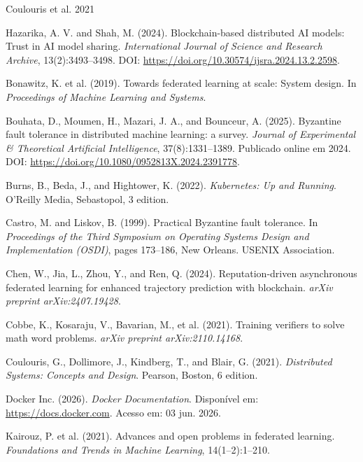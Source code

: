 \documentclass[12pt]{article}
\begin{document}
\begin{thebibliography}{Coulouris et al. 2021}

Hazarika, A. V. and Shah, M. (2024). Blockchain-based distributed AI models: Trust in AI model sharing. \textit{International Journal of Science and Research Archive}, 13(2):3493--3498. DOI: \url{https://doi.org/10.30574/ijsra.2024.13.2.2598}.

Bonawitz, K. et al. (2019). Towards federated learning at scale: System design. In \textit{Proceedings of Machine Learning and Systems}.

Bouhata, D., Moumen, H., Mazari, J. A., and Bounceur, A. (2025). Byzantine fault tolerance in distributed machine learning: a survey. \textit{Journal of Experimental \& Theoretical Artificial Intelligence}, 37(8):1331--1389. Publicado online em 2024. DOI: \url{https://doi.org/10.1080/0952813X.2024.2391778}.

Burns, B., Beda, J., and Hightower, K. (2022). \textit{Kubernetes: Up and Running}. O'Reilly Media, Sebastopol, 3 edition.

Castro, M. and Liskov, B. (1999). Practical Byzantine fault tolerance. In \textit{Proceedings of the Third Symposium on Operating Systems Design and Implementation (OSDI)}, pages 173--186, New Orleans. USENIX Association.

Chen, W., Jia, L., Zhou, Y., and Ren, Q. (2024). Reputation-driven asynchronous federated learning for enhanced trajectory prediction with blockchain. \textit{arXiv preprint arXiv:2407.19428}.

Cobbe, K., Kosaraju, V., Bavarian, M., et al. (2021). Training verifiers to solve math word problems. \textit{arXiv preprint arXiv:2110.14168}.

Coulouris, G., Dollimore, J., Kindberg, T., and Blair, G. (2021). \textit{Distributed Systems: Concepts and Design}. Pearson, Boston, 6 edition.

Docker Inc. (2026). \textit{Docker Documentation}. Disponível em: \url{https://docs.docker.com}. Acesso em: 03 jun. 2026.

Kairouz, P. et al. (2021). Advances and open problems in federated learning. \textit{Foundations and Trends in Machine Learning}, 14(1--2):1--210.


\end{thebibliography}
\end{document}
